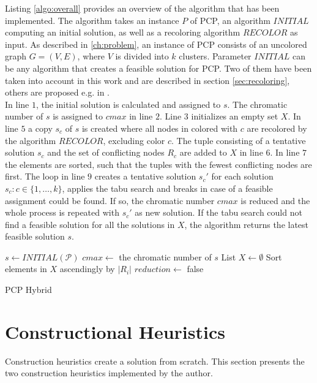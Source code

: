 Listing \ref{algo:overall} provides an overview of the algorithm that has been implemented. The algorithm takes an instance $P$ of PCP, an algorithm $\mathit{INITIAL}$ computing an initial solution, as well as a recoloring algorithm $\mathit{RECOLOR}$ as input. As described in \ref{ch:problem}, an instance of PCP consists of an uncolored graph $G=(V,E)$, where $V$ is divided into $k$ clusters. Parameter $\mathit{INITIAL}$ can be any algorithm that creates a feasible solution for PCP. Two of them have been taken into account in this work and are described in section \ref{sec:recoloring}, others are proposed e.g. in \cite{li-00}.\\
In line $1$, the initial solution is calculated and assigned to $s$. The chromatic number of $s$ is assigned to $cmax$ in line $2$. Line $3$ initializes an empty set $X$. In line $5$ a copy $s_c$ of $s$ is created where all nodes in colored with $c$ are recolored by the algorithm $\mathit{RECOLOR}$, excluding color $c$. The tuple consisting of a tentative solution $s_c$ and the set of conflicting nodes $R_c$ are added to $X$ in line $6$. In line $7$ the elements are sorted, such that the tuples with the fewest conflicting nodes are first. The loop in line $9$ creates a tentative solution $s_c'$ for each solution $s_c : c\in \{1,\ldots ,k\}$, applies the tabu search and breaks in case of a feasible assignment could be found. If so, the chromatic number $cmax$ is reduced and the whole process is repeated with $s_c'$ as new solution. If the tabu search could not find a feasible solution for all the solutions in $X$, the algorithm returns the latest feasible solution $s$.
\begin{algorithm}[h]
$s \gets INITIAL(\mathcal{P})$\;
$cmax \gets$ the chromatic number of $s$\;
List $X \gets \emptyset $\;
Sort elements in $X$ ascendingly by $|R_i|$\;
$reduction \gets$ false\;
\;
\caption{PCP Hybrid}
\label{algo:overall}
\end{algorithm}
\clearpage
\section{Constructional Heuristics}
\label{sec:construction}
Construction heuristics create a solution from scratch. This section presents the two construction heuristics implemented by the author.
